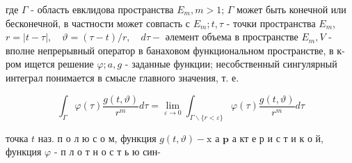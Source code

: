 \documentclass[10pt]{article}
\begin{document}
где $\Gamma$ - область евклидова пространства $E_{m}, m>1$; $\Gamma$ может быть конечной или бесконечной, в частности может совпасть с $E_{m} ; t, \tau$ - точки пространства $E_{m}$, $r=|t-\tau|, \quad \vartheta=(\tau-t) / r, \quad d \tau-$ әлемент объема в пространстве $E_{m}, V$ - вполне непрерывный оператор в банаховом функциональном пространстве, в к-ром ищется решение $\varphi ; a, g$ - заданные функции; несобственный сингулярный интеграл понимается в смысле главного значения, т. е.



\[

\int_{\Gamma} \varphi(\tau) \frac{g(t, \vartheta)}{r^{m}} d \tau=\lim _{\varepsilon \rightarrow 0} \int_{\Gamma \backslash\{r<\varepsilon\}} \varphi(\tau) \frac{g(t, \vartheta)}{r^{m}} d \tau

\]



точка $t$ наз. п о л ю с о м, функция $g(t, \vartheta)-\mathrm{x}$ а $\mathbf{p}$ а кт е р и с т и к о й, функция $\varphi$ - п л о т н о с т ь ю син-
\end{document}
